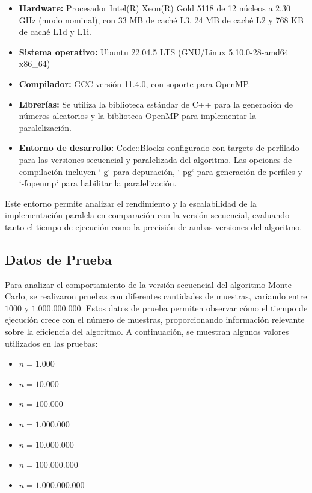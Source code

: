 \documentclass[a4paper, 10pt, onecolumn]{IEEEtran}
\begin{document}
\begin{itemize}
  \item \textbf{Hardware:} Procesador Intel(R) Xeon(R) Gold 5118 de 12 núcleos a 2.30 GHz (modo nominal), con 33 MB de caché L3, 24 MB de caché L2 y 768 KB de caché L1d y L1i.
  
  \item \textbf{Sistema operativo:} Ubuntu 22.04.5 LTS (GNU/Linux 5.10.0-28-amd64 x86\_64)
  
  \item \textbf{Compilador:} GCC \cite{gcc} versión 11.4.0, con soporte para OpenMP.
  
  \item \textbf{Librerías:} Se utiliza la biblioteca estándar de C++ para la generación de números aleatorios y la biblioteca OpenMP para implementar la paralelización.
  
  \item \textbf{Entorno de desarrollo:} Code::Blocks \cite{codeblocks} configurado con targets de perfilado para las versiones secuencial y paralelizada del algoritmo. Las opciones de compilación incluyen `-g` para depuración, `-pg` para generación de perfiles y `-fopenmp` para habilitar la paralelización.
\end{itemize}

Este entorno permite analizar el rendimiento y la escalabilidad de la implementación paralela en comparación con la versión secuencial, evaluando tanto el tiempo de ejecución como la precisión de ambas versiones del algoritmo.

\subsection{Datos de Prueba}
Para analizar el comportamiento de la versión secuencial del algoritmo Monte Carlo, se realizaron pruebas con diferentes cantidades de muestras, variando entre $1000$ y $1.000.000.000$. Estos datos de prueba permiten observar cómo el tiempo de ejecución crece con el número de muestras, proporcionando información relevante sobre la eficiencia del algoritmo. A continuación, se muestran algunos valores utilizados en las pruebas:

\begin{itemize}
  \item $n = 1.000$
  \item $n = 10.000$
  \item $n = 100.000$
  \item $n = 1.000.000$
  \item $n = 10.000.000$
  \item $n = 100.000.000$
  \item $n = 1.000.000.000$
\end{itemize}
\end{document}
